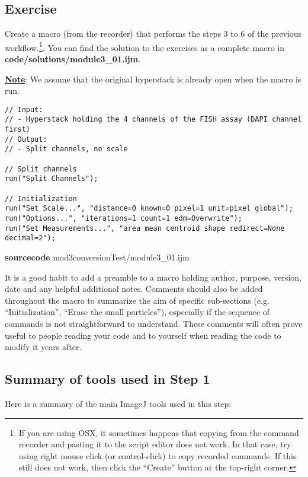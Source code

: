 \subsection{Exercise }
Create a macro (from the recorder) that performs the steps 3 to 6 of the previous workflow.\footnote{If you are using OSX, it sometimes happens that copying from the command recorder and pasting it to the script editor does not work. In that case, try using right mouse click (or control-click) to copy recorded commands. If this still does not work, then click the ``Create'' button at the top-right corner.}. You can find the solution to the exercises as a complete macro in \textbf{code/solutions/module3\_01.ijm}.

\underline{\textbf{Note}}: We assume that the original hyperstack is already open when the macro is run.


\begin{lstlisting}[linerange={1-4}]
// Input: 
// - Hyperstack holding the 4 channels of the FISH assay (DAPI channel first)
// Output: 
// - Split channels, no scale

// Split channels
run("Split Channels");

// Initialization
run("Set Scale...", "distance=0 known=0 pixel=1 unit=pixel global");
run("Options...", "iterations=1 count=1 edm=Overwrite");
run("Set Measurements...", "area mean centroid shape redirect=None decimal=2");
\end{lstlisting}
\textbf{sourcecode}\: mod3conversionTest/module3_01.ijm

It is a good habit to add a preamble to a macro holding author, purpose, version, date and any helpful additional notes. Comments should also be added throughout the macro to summarize the aim of specific sub-sections (e.g. ``Initialization'', ``Erase the small particles''), especially if the sequence of commands is not straightforward to understand. These comments will often prove useful to people reading your code and to yourself when reading the code to modify it years after.

\subsection{Summary of tools used in Step 1}

Here is a summary of the main ImageJ tools used in this step:

